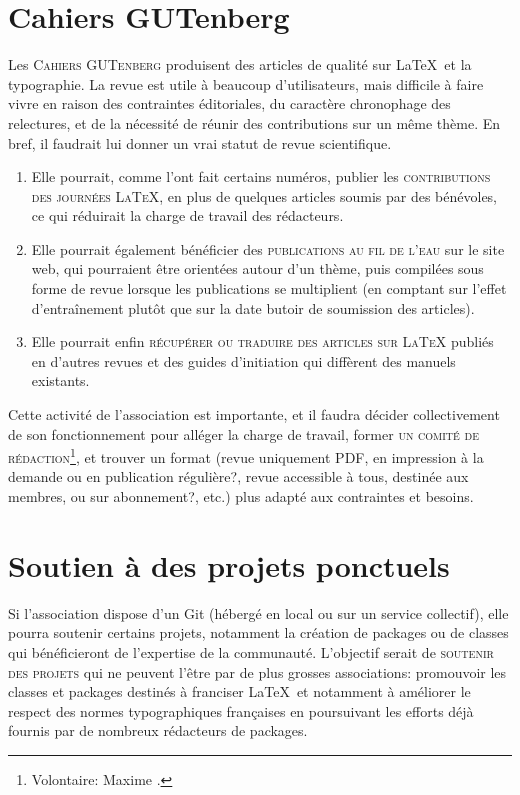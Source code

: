 \documentclass{tufte-handout}
\newcommand{\ratio}[3][]{\marginpar{\footnotesize{\textcolor{teal}{Temps requis: #2 / Utilité: #3}\par\noindent \textcolor{teal}{#1}}}}
\begin{document}
\section{Cahiers GUTenberg}

Les \textsc{Cahiers GUTenberg}\ratio[Chronophage, mais utile à la communauté et susceptible de bénéficier des autres projets]{++}{+++} produisent des articles de qualité sur \LaTeX\ et la typographie. La revue est utile à beaucoup d'utilisateurs, mais difficile à faire vivre en raison des contraintes éditoriales, du caractère chronophage des relectures, et de la nécessité de réunir des contributions sur un même thème. En bref, il faudrait lui donner un vrai statut de revue scientifique.

\begin{enumerate}
	\item Elle pourrait, comme l'ont fait certains numéros, publier les \textsc{contributions des journées \LaTeX}, en plus de quelques articles soumis par des bénévoles, ce qui réduirait la charge de travail des rédacteurs.
	\item Elle pourrait également bénéficier des \textsc{publications au fil de l'eau} sur le site web, qui pourraient être orientées autour d'un thème, puis compilées sous forme de revue lorsque les publications se multiplient (en comptant sur l'effet d'entraînement plutôt que sur la date butoir de soumission des articles).
	\item Elle pourrait enfin \textsc{récupérer ou traduire des articles sur \LaTeX} publiés en d'autres revues et des guides d'initiation qui diffèrent des manuels existants.
\end{enumerate}

Cette activité de l'association est importante, et il faudra décider collectivement de son fonctionnement pour alléger la charge de travail, former \textsc{un comité de rédaction}\footnote{Volontaire: Maxime .}, et trouver un format (revue uniquement PDF, en impression à la demande ou en publication régulière?, revue accessible à tous, destinée aux membres, ou sur abonnement?, etc.) plus adapté aux contraintes et besoins.


\section{Soutien à des projets ponctuels}

Si l'association dispose d'un Git\ratio[Sur la base du bénévolat uniquement]{+}{++} (hébergé en local ou sur un service collectif), elle pourra soutenir certains projets, notamment la création de packages ou de classes qui bénéficieront de l'expertise de la communauté. L'objectif serait de \textsc{soutenir des projets} qui ne peuvent l'être par de plus grosses associations: promouvoir les classes et packages destinés à franciser \LaTeX\, et notamment à améliorer le respect des normes typographiques françaises en poursuivant les efforts déjà fournis par de nombreux rédacteurs de packages.
\end{document}
